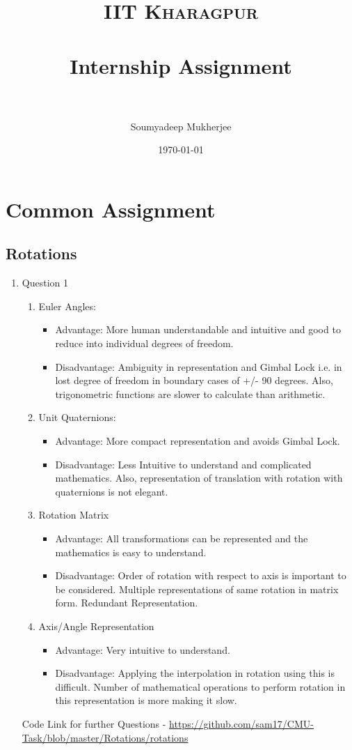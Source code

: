 \documentclass[paper=a4, fontsize=11pt]{scrartcl} %
\title{	
\normalfont \normalsize 
\textsc{IIT Kharagpur} \\ [25pt] %
\horrule{0.5pt} \\[0.4cm] %
\huge Internship Assignment \\ %
\horrule{2pt} \\[0.5cm] %
}
\author{Soumyadeep Mukherjee} %
\date{\normalsize\today} %
\numberwithin{equation}{section} %
\numberwithin{figure}{section} %
\numberwithin{table}{section} %
\begin{document}
\maketitle %

\section{Common Assignment}


\subsection{Rotations}
\begin{enumerate}
\item Question 1
\begin{enumerate}
\item Euler Angles:
\begin{itemize}
\item Advantage: More human understandable and intuitive and good to reduce into individual degrees of freedom.
\item Disadvantage: Ambiguity in representation and Gimbal Lock i.e. in lost degree of freedom in boundary cases of +/- 90 degrees. Also, trigonometric functions are slower to calculate than arithmetic.
\end{itemize}
\item Unit Quaternions:
\begin{itemize}
\item Advantage: More compact representation and avoids Gimbal Lock.
\item Disadvantage: Less Intuitive to understand and complicated mathematics. Also, representation of translation with rotation with quaternions is not elegant.
\end{itemize}
\item Rotation Matrix
\begin{itemize}
\item Advantage: All transformations can be represented and the mathematics is easy to understand.
\item Disadvantage: Order of rotation with respect to axis is important to be considered. Multiple representations of same rotation in matrix form. Redundant Representation.
\end{itemize}
\item Axis/Angle Representation
\begin{itemize}
\item Advantage: Very intuitive to understand.
\item Disadvantage: Applying the interpolation in rotation using this is difficult. Number of mathematical operations to perform rotation in this representation is more making it slow.
\end{itemize}
\end{enumerate}
Code Link for further Questions - \url{https://github.com/sam17/CMU-Task/blob/master/Rotations/rotations}


\end{enumerate}
\end{document}
